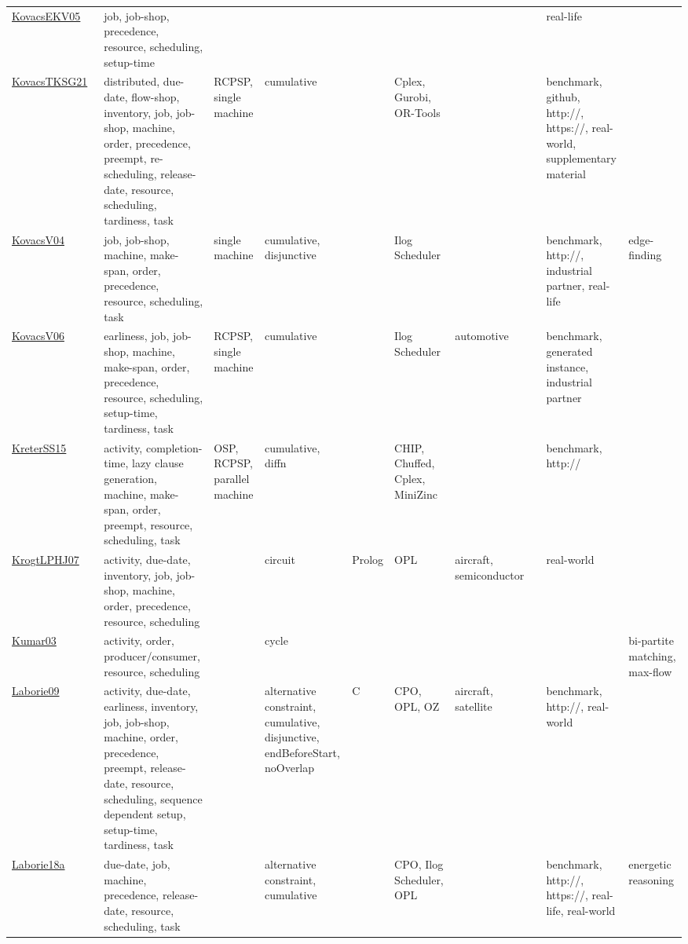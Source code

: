 {\begin{longtable}{p{3cm}p{4cm}p{2cm}p{2cm}p{2cm}p{2cm}p{2cm}p{2cm}p{2cm}p{2cm}}
\href{papers/KovacsEKV05.pdf}{KovacsEKV05}~\cite{KovacsEKV05} & job, job-shop, precedence, resource, scheduling, setup-time &  &  &  &  &  &  & real-life & \\
\href{papers/KovacsTKSG21.pdf}{KovacsTKSG21}~\cite{KovacsTKSG21} & distributed, due-date, flow-shop, inventory, job, job-shop, machine, order, precedence, preempt, re-scheduling, release-date, resource, scheduling, tardiness, task & RCPSP, single machine & cumulative &  & Cplex, Gurobi, OR-Tools &  &  & benchmark, github, http://, https://, real-world, supplementary material & \\
\href{papers/KovacsV04.pdf}{KovacsV04}~\cite{KovacsV04} & job, job-shop, machine, make-span, order, precedence, resource, scheduling, task & single machine & cumulative, disjunctive &  & Ilog Scheduler &  &  & benchmark, http://, industrial partner, real-life & edge-finding\\
\href{papers/KovacsV06.pdf}{KovacsV06}~\cite{KovacsV06} & earliness, job, job-shop, machine, make-span, order, precedence, resource, scheduling, setup-time, tardiness, task & RCPSP, single machine & cumulative &  & Ilog Scheduler & automotive &  & benchmark, generated instance, industrial partner & \\
\href{papers/KreterSS15.pdf}{KreterSS15}~\cite{KreterSS15} & activity, completion-time, lazy clause generation, machine, make-span, order, preempt, resource, scheduling, task & OSP, RCPSP, parallel machine & cumulative, diffn &  & CHIP, Chuffed, Cplex, MiniZinc &  &  & benchmark, http:// & \\
\href{papers/KrogtLPHJ07.pdf}{KrogtLPHJ07}~\cite{KrogtLPHJ07} & activity, due-date, inventory, job, job-shop, machine, order, precedence, resource, scheduling &  & circuit & Prolog & OPL & aircraft, semiconductor &  & real-world & \\
\href{papers/Kumar03.pdf}{Kumar03}~\cite{Kumar03} & activity, order, producer/consumer, resource, scheduling &  & cycle &  &  &  &  &  & bi-partite matching, max-flow\\
\href{papers/Laborie09.pdf}{Laborie09}~\cite{Laborie09} & activity, due-date, earliness, inventory, job, job-shop, machine, order, precedence, preempt, release-date, resource, scheduling, sequence dependent setup, setup-time, tardiness, task &  & alternative constraint, cumulative, disjunctive, endBeforeStart, noOverlap & C  & CPO, OPL, OZ & aircraft, satellite &  & benchmark, http://, real-world & \\
\href{papers/Laborie18a.pdf}{Laborie18a}~\cite{Laborie18a} & due-date, job, machine, precedence, release-date, resource, scheduling, task &  & alternative constraint, cumulative &  & CPO, Ilog Scheduler, OPL &  &  & benchmark, http://, https://, real-life, real-world & energetic reasoning\\

\end{longtable}}
